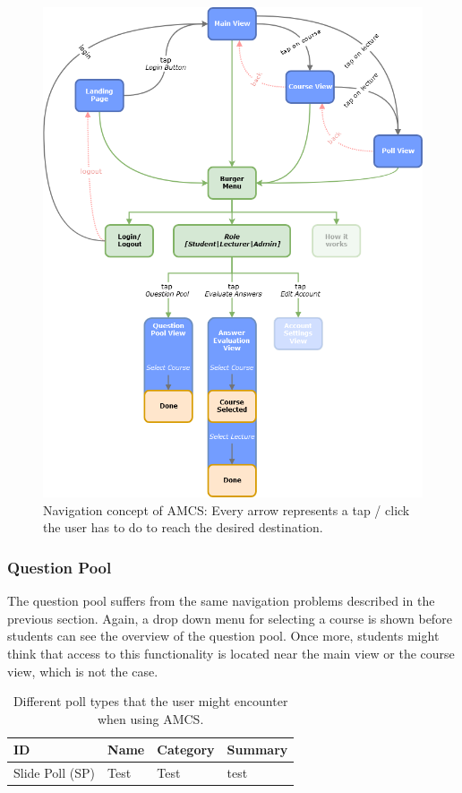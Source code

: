 \begin{figure}[ht]
	\centering
	\includegraphics[width=\textwidth]{diagrams/amcs-click-paths.png}
	\caption{Navigation concept of AMCS: Every arrow represents a tap / click the user has to do to reach the desired destination.}
	\label{figure:clickpathproblems}
\end{figure}
\subsubsection{Question Pool}

The question pool suffers from the same navigation problems described in the previous section. Again, a drop down menu for selecting a course is shown before students can see the overview of the question pool. Once more, students might think that access to this functionality is located near the main view or the course view, which is not the case.



\begin{table}[t]
	{\renewcommand{\arraystretch}{2}
		\begin{tabular}{ | p{1cm} | p{2.5cm} |  p{2.5cm} |  p{6cm} |}
			\hline
			ID & Name & Category & Summary \\ \hline \hline
			Slide Poll (SP) & Test & Test & test \\ \hline
		\end{tabular}
	}
	\caption{Different poll types that the user might encounter when using AMCS.}
	\label{tab:problems}
\end{table}

